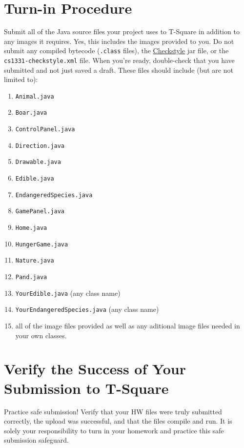\documentclass[12pt]{article}
\begin{document}
\section{Turn-in Procedure}
Submit all of the Java source files your project uses to T-Square in addition to any images it requires. Yes, this includes the images provided to you. Do not submit any compiled bytecode ({\tt .class} files), the \href{http://checkstyle.sourceforge.net/}{Checkstyle} jar file, or the {\tt cs1331-checkstyle.xml} file.  When you're ready, double-check that you have submitted and not just saved a draft.
These files should include (but are not limited to):
\begin{enumerate}
    \item {\tt Animal.java}
    \item {\tt Boar.java}
    \item {\tt ControlPanel.java}
    \item {\tt Direction.java}
    \item {\tt Drawable.java}
    \item {\tt Edible.java}
    \item {\tt EndangeredSpecies.java}
    \item {\tt GamePanel.java}
    \item {\tt Home.java}
    \item {\tt HungerGame.java}
    \item {\tt Nature.java}
    \item {\tt Pand.java}
    \item {\tt YourEdible.java} (any class name)
    \item {\tt YourEndangeredSpecies.java} (any class name)
    \item all of the image files provided as well as any aditional image files needed in your own classes.

\end{enumerate}
\newpage
\section{Verify the Success of Your Submission to T-Square}

Practice safe submission! Verify that your HW files were truly submitted correctly, the upload was successful, and that the files compile and run. It is solely your responsibility to turn in your homework and practice this safe submission safeguard.
\end{document}
